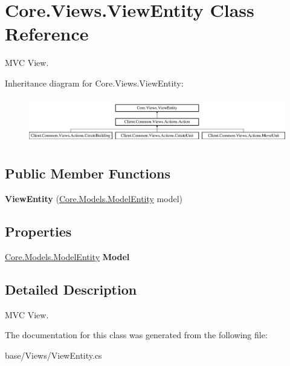 \hypertarget{classCore_1_1Views_1_1ViewEntity}{\section{Core.\-Views.\-View\-Entity Class Reference}
\label{classCore_1_1Views_1_1ViewEntity}
}


M\-V\-C View.  


Inheritance diagram for Core.\-Views.\-View\-Entity\-:\begin{figure}[H]
\begin{center}
\leavevmode
\includegraphics[height=2.036364cm]{classCore_1_1Views_1_1ViewEntity}
\end{center}
\end{figure}
\subsection*{Public Member Functions}
\begin{DoxyCompactItemize}
\item 
\hypertarget{classCore_1_1Views_1_1ViewEntity_acdc36500f751130de54bd6a7a1510090}{{\bfseries View\-Entity} (\hyperlink{classCore_1_1Models_1_1ModelEntity}{Core.\-Models.\-Model\-Entity} model)}\label{classCore_1_1Views_1_1ViewEntity_acdc36500f751130de54bd6a7a1510090}

\end{DoxyCompactItemize}
\subsection*{Properties}
\begin{DoxyCompactItemize}
\item 
\hypertarget{classCore_1_1Views_1_1ViewEntity_a02f7bdb82b8be688423db82f9cbde4a3}{\hyperlink{classCore_1_1Models_1_1ModelEntity}{Core.\-Models.\-Model\-Entity} {\bfseries Model}}\label{classCore_1_1Views_1_1ViewEntity_a02f7bdb82b8be688423db82f9cbde4a3}

\end{DoxyCompactItemize}


\subsection{Detailed Description}
M\-V\-C View. 



The documentation for this class was generated from the following file\-:\begin{DoxyCompactItemize}
\item 
base/\-Views/View\-Entity.\-cs\end{DoxyCompactItemize}
